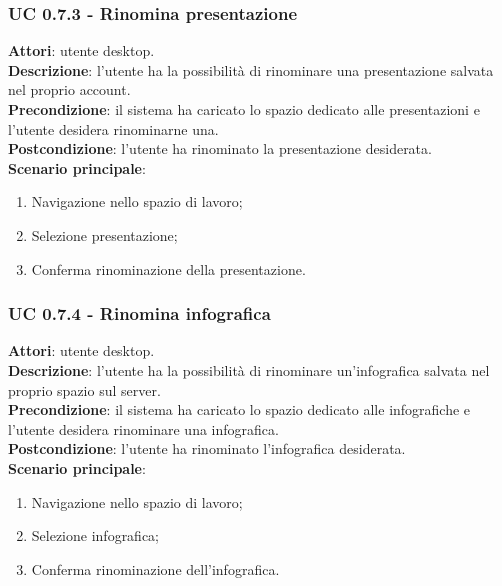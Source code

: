 	\subsubsection{UC 0.7.3 - Rinomina presentazione}{
		\label{uc0.7.3}
		\textbf{Attori}: utente desktop.	\\
		\textbf{Descrizione}: l'utente ha la possibilità di rinominare una presentazione salvata nel proprio account. \\
		\textbf{Precondizione}: il sistema ha caricato lo spazio dedicato alle presentazioni e l'utente desidera rinominarne una.	\\
		\textbf{Postcondizione}: l'utente ha rinominato la presentazione desiderata.	\\
		\textbf{Scenario principale}:
		\begin{enumerate}
			\item Navigazione nello spazio di lavoro;
			\item Selezione presentazione;
			\item Conferma rinominazione della presentazione.
		\end{enumerate}
		}
	\subsubsection{UC 0.7.4 - Rinomina infografica}{
		\label{uc0.7.4}
		\textbf{Attori}: utente desktop.	\\
		\textbf{Descrizione}: l'utente ha la possibilità di rinominare un'infografica salvata nel proprio spazio sul server. \\
		\textbf{Precondizione}: il sistema ha caricato lo spazio dedicato alle infografiche e l'utente desidera rinominare una infografica.	\\
		\textbf{Postcondizione}: l'utente ha rinominato l'infografica desiderata.	\\
		\textbf{Scenario principale}:
		\begin{enumerate}
			\item Navigazione nello spazio di lavoro;
			\item Selezione infografica;
			\item Conferma rinominazione dell'infografica.
		\end{enumerate}
		}
